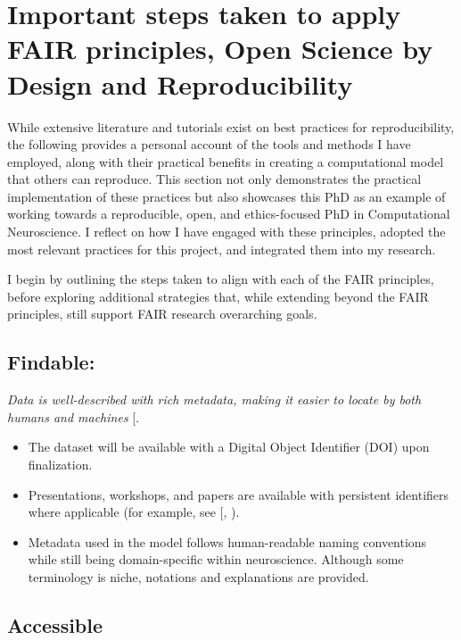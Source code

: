 \documentclass[
  11pt,
  letterpaper,
]{scrreprt}
\providecommand{\tightlist}{%
  \setlength{\itemsep}{0pt}\setlength{\parskip}{0pt}}\usepackage{longtable,booktabs,array}
\begin{document}
\section{Important steps taken to apply FAIR principles, Open Science by
Design and
Reproducibility}\label{important-steps-taken-to-apply-fair-principles-open-science-by-design-and-reproducibility}

While extensive literature and tutorials exist on best practices for
reproducibility, the following provides a personal account of the tools
and methods I have employed, along with their practical benefits in
creating a computational model that others can reproduce. This section
not only demonstrates the practical implementation of these practices
but also showcases this PhD as an example of working towards a
reproducible, open, and ethics-focused PhD in Computational
Neuroscience. I reflect on how I have engaged with these principles,
adopted the most relevant practices for this project, and integrated
them into my research.

I begin by outlining the steps taken to align with each of the FAIR
principles, before exploring additional strategies that, while extending
beyond the FAIR principles, still support FAIR research overarching
goals.

\subsection{Findable:}\label{findable}

\emph{Data is well-described with rich metadata, making it easier to
locate by both humans and machines}
{[}\citeproc{ref-jacobsen2020FAIR}{378}{]}.

\begin{itemize}
\tightlist
\item
  The dataset will be available with a Digital Object Identifier (DOI)
  upon finalization.
\item
  Presentations, workshops, and papers are available with persistent
  identifiers where applicable (for example, see
  {[},
  \citeproc{ref-romangarcia2023Data}{380}{]}).
\item
  Metadata used in the model follows human-readable naming conventions
  while still being domain-specific within neuroscience. Although some
  terminology is niche, notations and explanations are provided.
\end{itemize}

\subsection{Accessible}\label{accessible}
\end{document}
